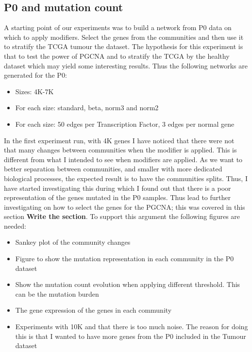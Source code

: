 \subsection{P0 and mutation count}

A starting point of our experiments was to build a network from P0 data on which to apply modifiers. Select the genes from the communities and then use it to stratify the TCGA tumour the dataset. The hypothesis for this experiment is that to test the power of PGCNA and to stratify the TCGA by the healthy dataset which may yield some interesting results. Thus the following networks are generated for the P0:

\begin{itemize}
    \item Sizes: 4K-7K
    \item For each size: standard, beta, norm3 and norm2
    \item For each size: 50 edges per Transcription Factor, 3 edges per normal gene
\end{itemize}


In the first experiment run, with 4K genes I have noticed that there were not that many changes between communities when the modifier is applied. This is different from what I intended to see when modifiers are applied. As we want to better separation between communities, and smaller with more dedicated biological processes, the expected result is to have the communities splits. Thus, I have started investigating this during which I found out that there is a poor representation of the genes mutated in the P0 samples. Thus lead to further investigating on how to select the genes for the PGCNA; this was covered in this section \textbf{Write the section}.
To support this argument the following figures are needed:
\begin{itemize}
    \item Sankey plot of the community changes 
    \item Figure to show the mutation representation in each community in the P0 dataset 
    \item Show the mutation count evolution when applying different threshold. This can be the mutation burden
    \item The gene expression of the genes in each community
    \item Experiments with 10K and that there is too much noise. The reason for doing this is that I wanted to have more genes from the P0 included in the Tumour dataset
\end{itemize}

